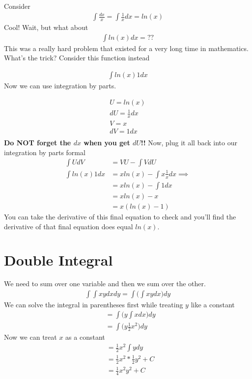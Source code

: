 \documentclass{article}
\begin{document}
Consider 
\begin{align}
    \int \frac{dx}{x} = \int \frac{1}{x} dx = ln(x)
\end{align}
Cool! Wait, but what about
\begin{align}
    \int ln(x) dx = ??
\end{align}
This was a really hard problem that existed for a very long time in mathematics. What's the trick? Consider this function instead 

\begin{align}
    \int ln(x) 1 dx 
\end{align}
Now we can use integration by parts.

\begin{align}
    U = ln(x) \\
    dU = \frac{1}{x} dx\\
    V = x \\
    dV = 1 dx\\
\end{align}
\textbf{Do NOT forget the $dx$ when you get $dU$!!} Now, plug it all back into our integration by parts formal 
\begin{align}
    \int U dV &= V U - \int V dU\\
    \int ln(x) 1 dx &= x ln(x) - \int x \frac{1}{x} dx \implies \\
    &= x ln(x) - \int 1 dx  \\
    & = x ln(x) - x\\
    &= x (ln(x) - 1)
\end{align}
You can take the derivative of this final equation to check and you'll find the derivative of that final equation does equal $ln(x)$.

\section{Double Integral}
We need to sum over one variable and then we sum over the other.
\begin{align}
    \int \int xy dx dy = \int \bigg(\int xy dx\bigg) dy 
\end{align}
We can solve the integral in parentheses first while treating $y$ like a constant 
\begin{align}
    &= \int \bigg( y\int x dx\bigg) dy \\
    &= \int \bigg( y\frac{1}{2} x^2 \bigg) dy
\end{align}
Now we can treat $x$ as a constant
\begin{align}
    &= \frac{1}{2} x^2 \int y dy\\
    & = \frac{1}{2} x^2 * \frac{1}{2} y^2 + C\\
    &= \frac{1}{4} x^2 y^2 + C
\end{align}
\end{document}

